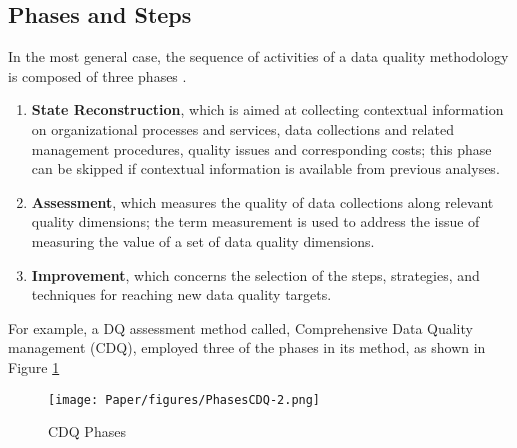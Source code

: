 \documentclass[pdftex,english,oribibl]{llncs}
\begin{document}
\subsection{Phases and Steps}

In the most general case, the sequence of activities of a data quality methodology is composed of three phases \cite{Batini2009MethodologiesForDataQuality}.

\begin{enumerate}
    \item \textbf{State Reconstruction}, which is aimed at collecting contextual information on organizational processes and services, data collections and related management procedures, quality issues and corresponding costs; this phase can be skipped if contextual information is available from previous analyses.
    \item \textbf{Assessment}, which measures the quality of data collections along relevant quality dimensions; the term measurement is used to address the issue of measuring the value of a set of data quality dimensions.
    \item \textbf{Improvement}, which concerns the selection of the steps, strategies, and techniques for reaching new data quality targets.
\end{enumerate}

For example, a DQ assessment method called, Comprehensive Data Quality management (CDQ),  employed three of the phases in its method, as shown in Figure \ref{fig:PhasesCDQ}

\begin{figure}
    \centering
    \texttt{[image: Paper/figures/PhasesCDQ-2.png]}
    \caption{CDQ Phases \cite{Batini2008ComprehensiveDQ}}
    \label{fig:PhasesCDQ}
 \end{figure}

\begin{comment}
The term assessment is used when such measurements are compared to reference values, in order to enable a diagnosis of quality. The term assessment is adopted in this article, consistent with the majority of methodologies, which stress the importance of the causes of poor data quality.
\end{comment}
\end{document}
